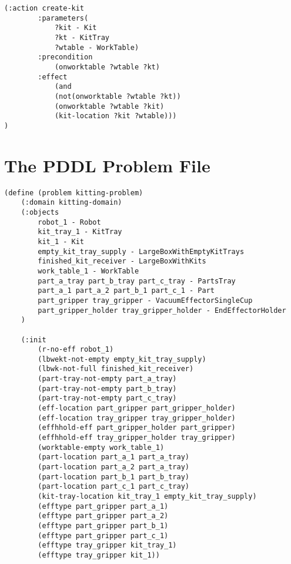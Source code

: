 \begin{appendices}
\begin{minipage}{.5\paperwidth}
\begin{mylisting}
\begin{Verbatim}[commandchars=\\\{\},commandchars=+\[\],fontsize=\small,numbersep=3pt]		
	(:action create-kit
		:parameters(
			?kit - Kit
			?kt - KitTray
			?wtable - WorkTable)
		:precondition
			(onworktable ?wtable ?kt)
		:effect
			(and
			(not(onworktable ?wtable ?kt))
			(onworktable ?wtable ?kit)
			(kit-location ?kit ?wtable)))
)
\end{Verbatim}
\end{mylisting}
\end{minipage}


\section{The PDDL Problem File}\label{appendix:B}

\begin{minipage}{.5\paperwidth}
\begin{mylisting}
\begin{Verbatim}[commandchars=\\\{\},commandchars=+\[\],fontsize=\small,numbersep=3pt]	
(define (problem kitting-problem)
	(:domain kitting-domain)
	(:objects
		robot_1 - Robot
		kit_tray_1 - KitTray
		kit_1 - Kit
		empty_kit_tray_supply - LargeBoxWithEmptyKitTrays
		finished_kit_receiver - LargeBoxWithKits
		work_table_1 - WorkTable
		part_a_tray part_b_tray part_c_tray - PartsTray
		part_a_1 part_a_2 part_b_1 part_c_1 - Part
		part_gripper tray_gripper - VacuumEffectorSingleCup
		part_gripper_holder tray_gripper_holder - EndEffectorHolder
	)

	(:init
		(r-no-eff robot_1)			
		(lbwekt-not-empty empty_kit_tray_supply)	
		(lbwk-not-full finished_kit_receiver)		
		(part-tray-not-empty part_a_tray)
		(part-tray-not-empty part_b_tray)
		(part-tray-not-empty part_c_tray)
		(eff-location part_gripper part_gripper_holder)
		(eff-location tray_gripper tray_gripper_holder)
		(effhhold-eff part_gripper_holder part_gripper)
		(effhhold-eff tray_gripper_holder tray_gripper)
		(worktable-empty work_table_1)
		(part-location part_a_1 part_a_tray)
		(part-location part_a_2 part_a_tray)
		(part-location part_b_1 part_b_tray)
		(part-location part_c_1 part_c_tray)
		(kit-tray-location kit_tray_1 empty_kit_tray_supply)
		(efftype part_gripper part_a_1)
		(efftype part_gripper part_a_2)
		(efftype part_gripper part_b_1)
		(efftype part_gripper part_c_1)
		(efftype tray_gripper kit_tray_1)
		(efftype tray_gripper kit_1))
\end{Verbatim}
\end{mylisting}
\end{minipage}



\end{appendices}
